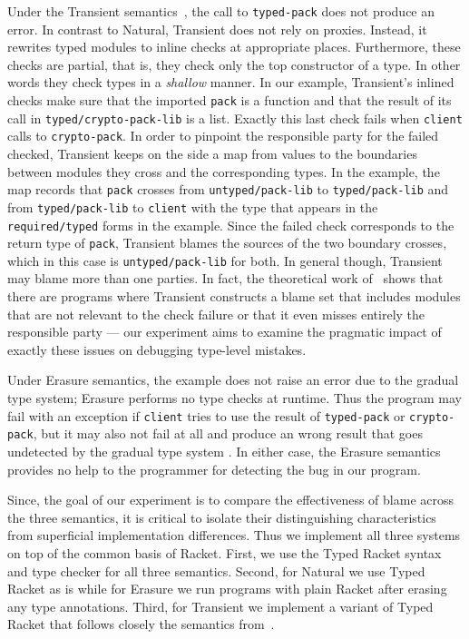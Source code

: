 Under the Transient semantics~\cite{vss-popl-2017}, the call to \texttt{typed-pack} does not
produce an error. In contrast to Natural, Transient does not rely on
proxies. Instead, it rewrites typed modules to inline checks at appropriate
places. Furthermore, these checks are
partial, that is, they check only the top constructor of a type. In other words
they check types in a  \emph{shallow} manner. In our
example, Transient's inlined checks make sure that the imported \texttt{pack} 
is a function and that the result of its call in \texttt{typed/crypto-pack-lib} is a list.   Exactly this
last check fails when \texttt{client} calls to \texttt{crypto-pack}. In
order to pinpoint the responsible party for the failed checked, Transient
keeps on the side a map from values to the boundaries between modules they
cross and the corresponding types. In the example, the map records that
\texttt{pack} crosses from \texttt{untyped/pack-lib} to
\texttt{typed/pack-lib} and from \texttt{typed/pack-lib} to
\texttt{client} with the type that appears in the \texttt{required/typed}
forms in the example. Since the failed check corresponds to the return
type of \texttt{pack}, Transient blames the sources of the two boundary
crosses, which in this case is \texttt{untyped/pack-lib} for both. In
general though, Transient may blame more than one parties. In fact, the
theoretical work of~\citet{gfd-oopsla-2019} shows that there are programs
where Transient constructs a blame set that includes modules that are not
relevant to the check failure or that it even misses entirely the responsible
party ---  our experiment aims to examine the pragmatic impact of exactly these
issues on debugging type-level mistakes.

Under Erasure semantics, the example does not raise an error due to the
gradual type system; Erasure performs no type checks at runtime. Thus the
program may fail with an exception if \texttt{client} tries to use the
result of \texttt{typed-pack} or \texttt{crypto-pack}, but it may also not
fail at all and produce an wrong result that goes undetected by the
gradual type system .  In either case, the Erasure semantics provides no
help to the programmer for detecting the bug in our program. 

Since, the goal of our experiment is to compare the effectiveness of blame
across the three semantics, it is critical to isolate their
distinguishing characteristics from superficial implementation
differences. Thus we implement all three systems on top of the common
basis of Racket. First, we use the Typed Racket syntax and type
checker for all three semantics. Second, for Natural we use Typed Racket as
is while for Erasure we run programs with plain Racket after erasing any
type annotations. Third, for Transient we implement a variant of Typed
Racket that follows closely the semantics from~\citet{vss-popl-2017}. 

